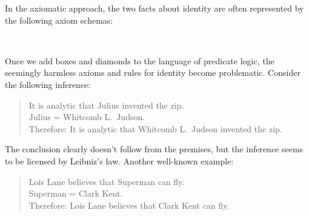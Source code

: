 In the axiomatic approach, the two facts about identity are often represented by
the following axiom schemas:
%
\begin{principles}
  \\
\end{principles}

Once we add boxes and diamonds to the language of predicate logic, the seemingly
harmless axioms and rules for identity become problematic. Consider the
following inference:
%
\begin{quote}
  It is analytic that Julius invented the zip.\\
  Julius = Whitcomb L.\ Judson.\\
  Therefore: It is analytic that Whitcomb L.\ Judson invented the zip.
\end{quote}
%
The conclusion clearly doesn't follow from the premises, but the inference seems
to be licensed by Leibniz's law. Another well-known example:
%
\begin{quote}
  Lois Lane believes that Superman can fly.\\
  Superman = Clark Kent.\\
  Therefore: Lois Lane believes that Clark Kent can fly.
\end{quote}

